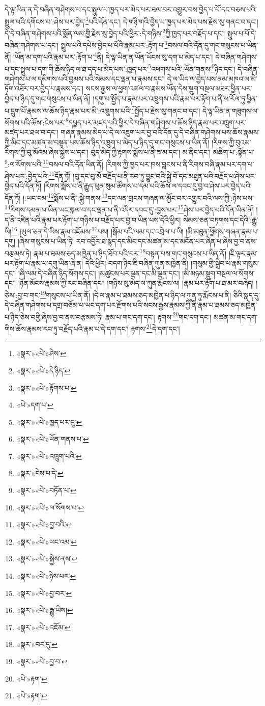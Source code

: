 དེ་ལྟ་ཡིན་ན་དེ་བཞིན་གཤེགས་པ་དང་སྤྲུལ་པ་ཁྱད་པར་མེད་པར་ཐལ་བར་འགྱུར་བས་བྱེད་པ་པོ་དང་བཅས་པའི་སྤྲུལ་པའི་དགོངས་པ་:ཤེས་པར་བྱེད་\footnote{«སྣར་»«པེ་»ཤེས་}པའི་དོན་དང་། དེ་གཉི་གའི་བྱེད་པ་ཁྱད་པར་མེད་པས་རྗེས་སུ་གནང་བ་དང་། དེ་དེ་བཞིན་གཤེགས་པའི་སྨོན་ལམ་གྱི་རྗེས་སུ་བྱེད་པའི་ཕྱིར་:དེ་གཉིས་\footnote{«སྣར་»«པེ་»དེ་ཉིད་}ཀྱི་ཁྱད་པར་བརྗོད་པ་དང་། སྤྲུལ་པ་པོ་དེ་བཞིན་གཤེགས་པ་དང་། སྤྲུལ་པའི་དཔེས་བྱེད་པ་པོའི་རྣམ་པར་:རྟོག་པ་\footnote{«སྣར་»«པེ་»རྟོགས་པ་}བསལ་བའི་དོན་དུ་གང་གསུངས་པ་ཡིན་ནོ། །ཡོན་མ་དག་པའི་རྣམ་པར་:རྟོག་པ་\footnote{«པེ་»དག་པ་}ནི། དེ་ལྟ་ཡིན་ན་ཡོན་ཡོངས་སུ་དག་པ་མེད་པ་དང་། དེ་བཞིན་གཤེགས་པ་དང་སྤྲུལ་པ་དག་གི་ཆོས་ཉིད་ལ་ཐ་དད་པ་མེད་པས་:ཁྱད་པར་\footnote{«སྣར་»«པེ་»ཁྱད་པར་དུ་}འཕགས་པའི་:ཡོན་གནས་\footnote{«སྣར་»«པེ་»ཡོན་གནས་པ་}ཉིད་དང་། དེ་བཞིན་གཤེགས་པ་ལ་དམིགས་པའི་བྱམས་པའི་སེམས་དང་ལྡན་པ་རྣམས་དང་། དེ་ལ་ཡིད་ལ་བྱེད་པས་ནམ་མཁའ་ལ་མེ་ཏོག་འཐོར་བར་བྱེད་པ་རྣམས་དང་། སངས་རྒྱས་ལ་ཕྱག་འཚལ་བ་རྣམས་ཡོན་དེས་སྡུག་བསྔལ་མཐར་ཕྱིན་པར་བྱེད་པ་ཉིད་དུ་གང་གསུངས་པ་ཡིན་ནོ། །དགུ་པ་སྤྱོད་པ་རྣམ་པར་འཁྲུགས་པའི་རྣམ་པར་རྟོག་པ་ནི་ཕ་རོལ་ཏུ་ཕྱིན་པ་དྲུག་པོ་རྣམས་ལ་ཆོས་ཉིད་རྣམ་པར་མི་:འཁྲུགས་པའི་\footnote{«སྣར་»«པེ་»འཁྲུག་པའི་}སྤྱོད་པ་རྗེས་སུ་གནང་བ་དང་། དེ་ལྟ་ཡིན་ན་གཟུགས་ལ་སོགས་པའི་ཆོས་:ངེས་པར་\footnote{«སྣར་»ངེས་པ་དེ་}དཔྱད་པར་མཛད་པའི་ཕྱིར་དེ་བཞིན་གཤེགས་པ་ཆོས་ཉིད་རྣམ་པར་འཁྲུག་པར་མཛད་པར་ཐལ་བ་དང་། གཞན་རྣམས་མེད་པ་དེ་ལ་འཇུག་པར་བྱ་བའི་དོན་དུ་དེ་བཞིན་གཤེགས་པས་ཆོས་རྣམས་ཀྱི་མིང་དང་མཚན་མ་བསྟན་པས་ཆོས་ཉིད་འཁྲུག་པ་མེད་པ་ཉིད་དུ་གང་གསུངས་པ་ཡིན་ནོ། །རིགས་ཀྱི་བུའམ་རིགས་ཀྱི་བུ་མོའམ་ཞེས་སྐྱེས་པ་དང་། བུད་མེད་ཀྱི་རྟགས་སྨོས་པ་ནི་ཟ་མ་དང་། མ་ནིང་དང་། མཆིག་པ་:སྟོན་པ་\footnote{«སྣར་»«པེ་»བཏོན་པ་}:ལ་སོགས་པའི་\footnote{«སྣར་»«པེ་»ལ་སོགས་པ་}བསལ་བའི་དོན་ཡིན་ནོ། །རིགས་ཀྱི་ཁྱད་པར་ཁས་བླངས་པ་ནི་རིགས་བཞི་རྣམ་པར་དག་པ་ཤེས་པར་:བྱེད་པའི་\footnote{«སྣར་»«པེ་»བྱ་བའི་}དོན་ཏོ། །བུ་དང་བུ་མོ་བརྗོད་པ་ནི་རབ་ཏུ་བྱུང་བའི་སྐྱེ་བོ་དང་མཐུན་པའི་བརྗོད་པ་ཤེས་པར་བྱེད་པའི་དོན་ཏོ། །རིགས་སྨོས་པ་ནི་རྒྱུད་ཕུན་སུམ་ཚོགས་པ་དམ་པའི་ཆོས་ལ་དབང་དུ་བྱ་བ་ཤེས་པར་བྱེད་པའི་དོན་ཏོ། །:ཡང་ངམ་\footnote{«སྣར་»«པེ་»ཡང་འམ་}སྨོས་པ་ནི་:སྐྱེ་གནས་\footnote{«སྣར་»«པེ་»སྐྱེས་ནས་}དང་ལན་གྲངས་གཞན་ལ་མྱོང་བར་འགྱུར་བའི་ལས་ཀྱི་:ཉེས་པས་\footnote{«སྣར་»«པེ་»ཉེས་པར་}རིགས་དམན་པ་ཡིན་ཡང་སྐལ་བ་དང་ལྡན་པ་ནི་འདིར་དབང་དུ་:བྱས་པར་\footnote{«སྣར་»«པེ་»བྱ་བར་}ཤེས་པར་བྱེད་པའི་དོན་ཡིན་ནོ། །ད་ནི་འཛིན་པའི་རྣམ་པར་རྟོག་པ་གཉིས་པ་བརྗོད་པར་བྱ་བ་ཡིན་པས་དེའི་ཕྱིར། སེམས་ཅན་བཏགས་དང་དེའི་:རྒྱུ་ཡི།\footnote{«སྣར་»«པེ་»རྒྱུ་ཡིས།} །ཡུལ་ཅན་དེ་ཡིས་རྣམ་འཇོམས་\footnote{«སྣར་»«པེ་»འཇོམ་}པས། །སྒོམ་པའི་ལམ་དང་འབྲེལ་པ་ཡི། །མི་མཐུན་ཕྱོགས་གཞན་རྣམ་པ་དགུ། །ཞེས་གསུངས་པ་ཡིན་ཏེ། རབ་འབྱོར་ཐ་སྙད་དང་མིང་དང་མཚན་མ་དང་མངོན་པར་ཞེན་པ་ཞེས་བྱ་བ་ནས་བརྩམས་ཏེ། རྣམ་པ་ཐམས་ཅད་མཁྱེན་པ་ཉིད་ཐོབ་པའི་བར་\footnote{«སྣར་»བར་དུ་}བསྟན་པས་གང་གསུངས་པ་ཡིན་ནོ། །ཇི་ལྟར་རྣམ་པར་རྟོག་པ་རྣམ་པ་དགུ་ཡིན་ཞེ་ན། དེའི་ཕྱིར། བདག་ཉིད་ཇི་བཞིན་ཀུན་མཁྱེན་ནི། །གསུམ་གྱི་སྒྲིབ་པ་རྣམ་གསུམ་དང་། །ཞི་ལམ་དེ་བཞིན་ཉིད་སོགས་དང་། །མཚུངས་པར་ལྡན་དང་མི་ལྡན་དང་། །མི་མཉམ་སྡུག་བསྔལ་ལ་སོགས་དང་། །ཉོན་མོངས་རྣམས་ཀྱི་རང་བཞིན་དང་། །གཉིས་སུ་མེད་ལ་ཀུན་རྨོངས་ལ། །རྣམ་པར་རྟོག་པ་ཐ་མར་བཞེད། །ཅེས་:བྱ་བ་གང་\footnote{«སྣར་»«པེ་»བྱ་བ་}གསུངས་པ་ཡིན་ནོ། །དེ་ལ་རྣམ་པ་ཐམས་ཅད་མཁྱེན་པ་ཉིད་ལ་ཀུན་ཏུ་རྨོངས་པ་ནི། ཅིའི་སླད་དུ་དེ་བཞིན་གཤེགས་པ་དགྲ་བཅོམ་པ་ཡང་དག་པར་རྫོགས་པའི་སངས་རྒྱས་རྣམས་ཀྱི་ནི་རྣམ་པ་ཐམས་ཅད་མཁྱེན་པ་ཉིད་ཅེས་བགྱི་ཞེས་བྱ་བ་ནས་བརྩམས་ཏེ། རྣམ་པ་གང་དག་དང་། རྟགས་\footnote{«པེ་»རྟག་}གང་དག་དང་། མཚན་མ་གང་དག་གིས་ཆོས་རྣམས་རབ་ཏུ་བརྗོད་པའི་རྣམ་པ་དེ་དག་དང་། རྟགས་\footnote{«པེ་»རྟག་}དེ་དག་དང་། 